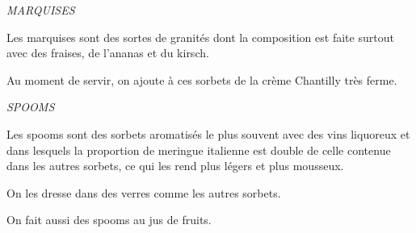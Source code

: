 \bigskip

\begin{center}
\textit{MARQUISES}
\end{center}

\bigskip

Les marquises sont des sortes de granités dont la composition est faite surtout
avec des fraises, de l'ananas et du kirsch.

Au moment de servir, on ajoute à ces sorbets de la crème Chantilly très ferme.

\bigskip

\begin{center}
\textit{SPOOMS}
\end{center}

\bigskip

Les spooms sont des sorbets aromatisés le plus souvent avec des vins liquoreux
et dans lesquels la proportion de meringue italienne est double de celle
contenue dans les autres sorbets, ce qui les rend plus légers et plus mousseux.

On les dresse dans des verres comme les autres sorbets.

\sk

On fait aussi des spooms au jus de fruits.
